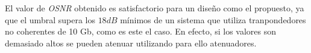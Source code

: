 El valor de \emph{OSNR} obtenido es satisfactorio para un diseño como
el propuesto, ya que el umbral supera los $18dB$ mínimos de un sistema
que utiliza tranpondedores no coherentes de 10 Gb, como es este el
caso. En efecto, si los valores son demasiado altos se pueden atenuar
utilizando para ello atenuadores.
